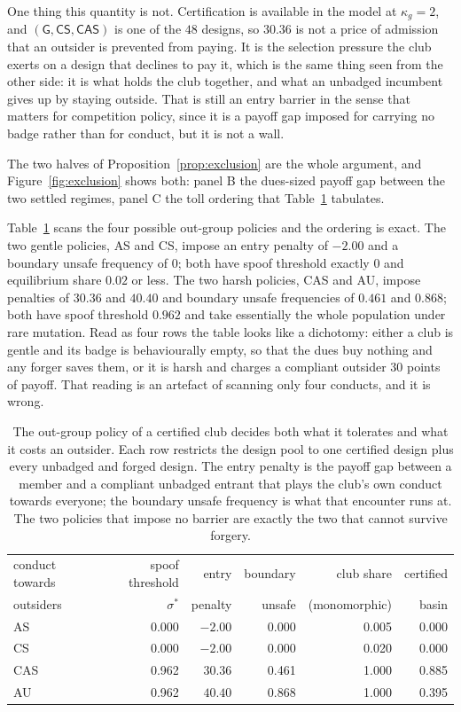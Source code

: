 \documentclass[11pt,a4paper]{article}
\theoremstyle{definition}
\newcommand{\AS}{\textsf{AS}}
\newcommand{\CS}{\textsf{CS}}
\newcommand{\CAS}{\textsf{CAS}}
\newcommand{\AU}{\textsf{AU}}
\begin{document}
One thing this quantity is not. Certification is available in the model at
$\kappa_g = 2$, and $(\mathsf{G}, \CS, \CAS)$ is one of the $48$ designs, so
$30.36$ is not a price of admission that an outsider is prevented from paying.
It is the selection pressure the club exerts on a design that declines to pay
it, which is the same thing seen from the other side: it is what holds the club
together, and what an unbadged incumbent gives up by staying outside. That is
still an entry barrier in the sense that matters for competition policy, since
it is a payoff gap imposed for carrying no badge rather than for conduct, but
it is not a wall.

The two halves of Proposition~\ref{prop:exclusion} are the whole argument,
and Figure~\ref{fig:exclusion} shows both: panel B the dues-sized payoff gap
between the two settled regimes, panel C the toll ordering that
Table~\ref{tab:outgroup} tabulates.

Table~\ref{tab:outgroup} scans the four possible out-group policies and the
ordering is exact. The two gentle policies, \AS{} and \CS{}, impose an entry
penalty of $-2.00$ and a boundary unsafe frequency of $0$; both have spoof
threshold exactly $0$ and equilibrium share $0.02$ or less. The two harsh
policies, \CAS{} and \AU{}, impose penalties of $30.36$ and $40.40$ and
boundary unsafe frequencies of $0.461$ and $0.868$; both have spoof threshold
$0.962$ and take essentially the whole population under rare mutation. Read as
four rows the table looks like a dichotomy: either a club is gentle and its
badge is behaviourally empty, so that the dues buy nothing and any forger saves
them, or it is harsh and charges a compliant outsider $30$ points of payoff.
That reading is an artefact of scanning only four conducts, and it is wrong.

\begin{table}[t]
\centering
\caption{The out-group policy of a certified club decides both what it
tolerates and what it costs an outsider. Each row restricts the design pool to
one certified design plus every unbadged and forged design. The entry penalty
is the payoff gap between a member and a compliant unbadged entrant that plays
the club's own conduct towards everyone; the boundary unsafe frequency is what
that encounter runs at. The two policies that impose no barrier are exactly the
two that cannot survive forgery.}
\label{tab:outgroup}
\small
\begin{tabular}{lrrrrr}
\toprule
conduct towards & spoof threshold & entry & boundary & club share & certified \\
outsiders & $\sigma^{*}$ & penalty & unsafe & (monomorphic) & basin \\
\midrule
\AS{}  & 0.000 & $-2.00$ & 0.000 & 0.005 & 0.000 \\
\CS{}  & 0.000 & $-2.00$ & 0.000 & 0.020 & 0.000 \\
\CAS{} & 0.962 & $30.36$ & 0.461 & 1.000 & 0.885 \\
\AU{}  & 0.962 & $40.40$ & 0.868 & 1.000 & 0.395 \\
\bottomrule
\end{tabular}
\end{table}
\end{document}
